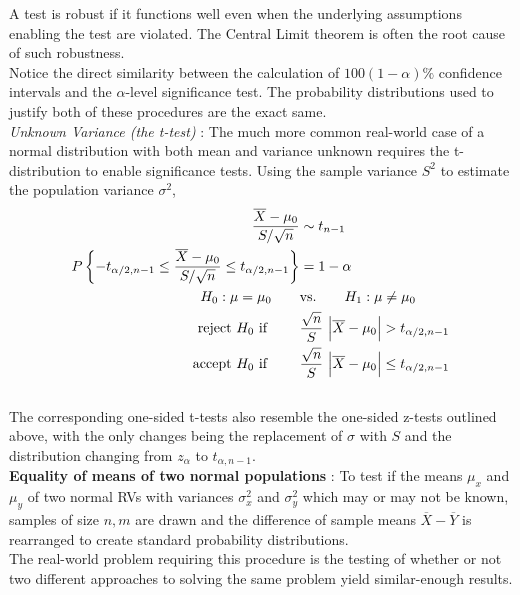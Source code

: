 A test is robust if it functions well even when the underlying assumptions enabling the test are violated. The Central Limit theorem is often the root cause of such robustness.\\

Notice the direct similarity between the calculation of $ 100(1-\alpha)\% $ confidence intervals and the $ \alpha $-level significance test. The probability distributions used to justify both of these procedures are the exact same. \\

\textit{Unknown Variance (the t-test) } : The much more common real-world case of a normal distribution with both mean and variance unknown requires the t-distribution to enable significance tests. Using the sample variance $ S^2 $ to estimate the population variance $ \sigma^2 $,\\

\begin{align}
	\frac{\overline{X} - \mu_0}{S / \sqrt{n}} &\sim t_{n-1} \nonumber \\
	P \left\{ -t_{\alpha/2, n-1} \leq \frac{\overline{X} - \mu_0}{S / \sqrt{n}} \leq t_{\alpha/2, n-1} \right\} &= 1- \alpha \nonumber \\
	H_0 : \mu = \mu_0 \qquad &\text{vs.} \qquad H_1 : \mu \neq \mu_0 \nonumber \\
	\text{reject $ H_0 $ if } \qquad & \frac{\sqrt{n}}{S}\ \Big| \overline{X} - \mu_0 \Big| > t_{\alpha/2, n-1} \nonumber \\
	\text{accept $ H_0 $ if } \qquad & \frac{\sqrt{n}}{S}\ \Big| \overline{X} - \mu_0 \Big| \leq t_{\alpha/2, n-1}
\end{align} \\

The corresponding one-sided t-tests also resemble the one-sided z-tests outlined above, with the only changes being the replacement of $ \sigma $ with $ S $ and the distribution changing from $ z_\alpha $ to $ t_{\alpha, n-1} $.\\

\textbf{Equality of means of two normal populations} : To test if the means $ \mu_x $ and $ \mu_y $ of two normal RVs with variances $ \sigma_x^2 $ and $ \sigma_y^2 $ which may or may not be known, samples of size $ n, m $ are drawn and the difference of sample means $ \overline{X} - \overline{Y} $ is rearranged to create standard probability distributions.\\

The real-world problem requiring this procedure is the testing of whether or not two different approaches to solving the same problem yield similar-enough results.\\


